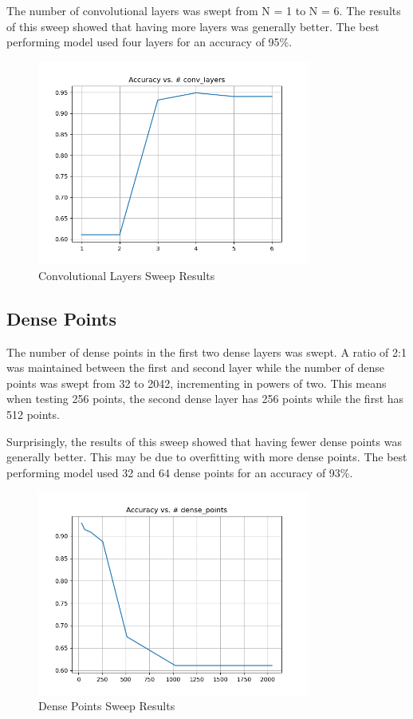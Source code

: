 \documentclass{article}
\begin{document}
The number of convolutional layers was swept from N = 1 to N = 6. The results of this sweep showed that having more layers was generally better. The best performing model used four layers for an accuracy of 95\%. 

\begin{figure}[H]
    \centering
    \includegraphics[width=0.8\textwidth]{../media/conv_layers_sweep.png}
    \caption{Convolutional Layers Sweep Results}
    \label{fig:conv}
\end{figure}

\subsection{Dense Points}

The number of dense points in the first two dense layers was swept. A ratio of 2:1 was maintained between the first and second layer  while the number of dense points was swept from 32 to 2042, incrementing in powers of two. This means when testing 256 points, the second dense layer has 256 points while the first has 512 points. 

Surprisingly, the results of this sweep showed that having fewer dense points was generally better. This may be due to overfitting with more dense points. The best performing model used 32 and 64 dense points for an accuracy of 93\%. 

\begin{figure}[H]
    \centering
    \includegraphics[width=0.8\textwidth]{../media/dense_points_sweep.png}
    \caption{Dense Points Sweep Results}
    \label{fig:dense}
\end{figure}
\end{document}
